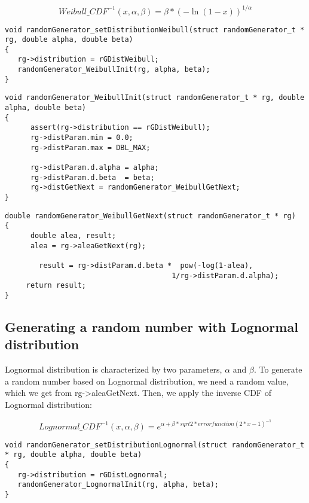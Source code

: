   $$Weibull\_CDF^{-1}(x,\alpha,\beta)=\beta*(-\ln(1-x))^{1/\alpha}$$

\begin{verbatim}
void randomGenerator_setDistributionWeibull(struct randomGenerator_t * rg, double alpha, double beta)
{
   rg->distribution = rGDistWeibull;
   randomGenerator_WeibullInit(rg, alpha, beta);
}
\end{verbatim}


\begin{verbatim}
void randomGenerator_WeibullInit(struct randomGenerator_t * rg, double alpha, double beta)
{
      assert(rg->distribution == rGDistWeibull);   
      rg->distParam.min = 0.0;
      rg->distParam.max = DBL_MAX;
  
      rg->distParam.d.alpha = alpha;
      rg->distParam.d.beta  = beta; 
      rg->distGetNext = randomGenerator_WeibullGetNext;
}
\end{verbatim}

\begin{verbatim}
double randomGenerator_WeibullGetNext(struct randomGenerator_t * rg)
{
      double alea, result;
      alea = rg->aleaGetNext(rg);

        result = rg->distParam.d.beta *  pow(-log(1-alea), 
                                       1/rg->distParam.d.alpha);
     return result;
}
\end{verbatim}

\subsection{Generating a random number with Lognormal distribution}
\label{lognormal_dist}

Lognormal distribution is characterized by two parameters, $\alpha$ and $\beta$.
To generate a random number based on Lognormal distribution, we need a random value, which we get from rg->aleaGetNext. Then, we apply the inverse CDF of Lognormal distribution:

   $$ Lognormal\_CDF^{-1}(x,\alpha,\beta) = e^{\alpha + \beta * sqrt{2} * errorfunction(2*x-1)^{-1}} $$

\begin{verbatim}
void randomGenerator_setDistributionLognormal(struct randomGenerator_t * rg, double alpha, double beta)
{
   rg->distribution = rGDistLognormal;
   randomGenerator_LognormalInit(rg, alpha, beta);
} 
\end{verbatim}

